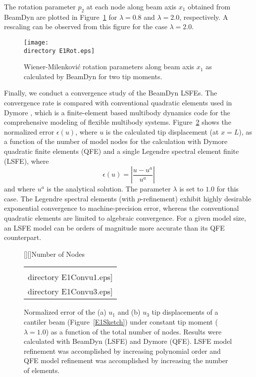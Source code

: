 The rotation parameter $p_2$ at each node along beam axis $x_1$ obtained from BeamDyn are plotted in Figure~\ref{E1Rot} for $\lambda = 0.8$ and $\lambda = 2.0$, respectively. A rescaling can be observed from this figure for the case $\lambda = 2.0$.
\begin{figure}
    \centering
    \texttt{[image: \\directory E1Rot.eps]}
    \caption{Wiener-Milenkovi\'c rotation parameters along beam axis $x_1$
as calculated by BeamDyn for two tip moments.  }
    \label{E1Rot}
\end{figure}

Finally, we conduct a convergence study of the BeamDyn LSFEs. The
convergence rate is compared with conventional quadratic elements used in
Dymore \cite{Dymore:2013}, which is a finite-element
based multibody dynamics code for the comprehensive modeling of flexible
multibody systems. 
Figure~\ref{E1Conv} shows the normalized error
$\epsilon(u)$, where $u$ is the calculated tip displacement (at $x=L$), as a function
of the number of model nodes for the calculation with Dymore quadratic finite
elements (QFE) and a single Legendre spectral element finite (LSFE), where
\begin{equation}
    \label{E1Error}
    \epsilon(u) = \left| \frac{u-u^a}{u^a} \right|
\end{equation}
and where $u^a$ is the analytical solution.  The parameter $\lambda$ is set
to $1.0$ for this case. The Legendre spectral elements (with $p$-refinement)
exhibit highly desirable exponential convergence to machine-precision error,
whereas the conventional quadratic elements are limited to algebraic
convergence.    For a given model size, an LSFE model can be orders of magnitude
more accurate than its QFE counterpart.

\begin{figure}
    \centering
    [][]{Number of Nodes}
    \begin{tabular}{c}
    \subfloat[$u_1$]{\label{E1Conv:u1}\texttt{[image: \\directory  E1Convu1.eps]}} \qquad
\subfloat[$u_3$]{\label{E1Conv:u3}\texttt{[image: \\directory  E1Convu3.eps]}}\\
\end{tabular}
\caption{Normalized error of the (a) $u_1$ and (b) $u_3$ tip displacements
of a cantiler beam (Figure~\ref{E1Sketch}) under constant tip
moment ($\lambda = 1.0$) as a function of the total number of nodes. Results were calculated
with BeamDyn (LSFE) and Dymore (QFE).  LSFE model refinement was accomplished
by increasing polynomial order and QFE model refinement was accomplished by
increasing the number of elements.  }
\label{E1Conv}
\end{figure}

